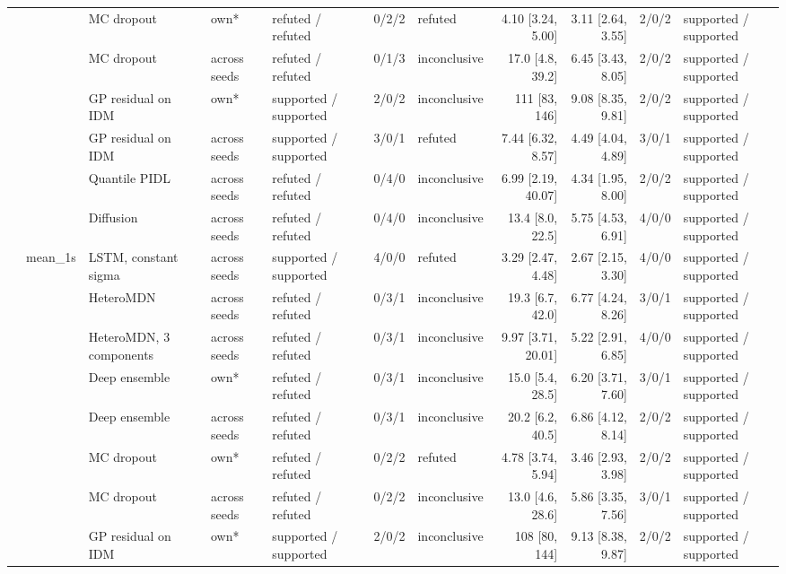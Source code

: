 \begin{longtable}{lllllrlrrrl}
 &  & MC dropout & own* & refuted / refuted & 0/2/2 & refuted & 4.10 [3.24, 5.00] & 3.11 [2.64, 3.55] & 2/0/2 & supported / supported \\
 &  & MC dropout & across seeds & refuted / refuted & 0/1/3 & inconclusive & 17.0 [4.8, 39.2] & 6.45 [3.43, 8.05] & 2/0/2 & supported / supported \\
 &  & GP residual on IDM & own* & supported / supported & 2/0/2 & inconclusive & 111 [83, 146] & 9.08 [8.35, 9.81] & 2/0/2 & supported / supported \\
 &  & GP residual on IDM & across seeds & supported / supported & 3/0/1 & refuted & 7.44 [6.32, 8.57] & 4.49 [4.04, 4.89] & 3/0/1 & supported / supported \\
 &  & Quantile PIDL & across seeds & refuted / refuted & 0/4/0 & inconclusive & 6.99 [2.19, 40.07] & 4.34 [1.95, 8.00] & 2/0/2 & supported / supported \\
 &  & Diffusion & across seeds & refuted / refuted & 0/4/0 & inconclusive & 13.4 [8.0, 22.5] & 5.75 [4.53, 6.91] & 4/0/0 & supported / supported \\
\midrule
 & mean\_1s & LSTM, constant sigma & across seeds & supported / supported & 4/0/0 & refuted & 3.29 [2.47, 4.48] & 2.67 [2.15, 3.30] & 4/0/0 & supported / supported \\
 &  & HeteroMDN & across seeds & refuted / refuted & 0/3/1 & inconclusive & 19.3 [6.7, 42.0] & 6.77 [4.24, 8.26] & 3/0/1 & supported / supported \\
 &  & HeteroMDN, 3 components & across seeds & refuted / refuted & 0/3/1 & inconclusive & 9.97 [3.71, 20.01] & 5.22 [2.91, 6.85] & 4/0/0 & supported / supported \\
 &  & Deep ensemble & own* & refuted / refuted & 0/3/1 & inconclusive & 15.0 [5.4, 28.5] & 6.20 [3.71, 7.60] & 3/0/1 & supported / supported \\
 &  & Deep ensemble & across seeds & refuted / refuted & 0/3/1 & inconclusive & 20.2 [6.2, 40.5] & 6.86 [4.12, 8.14] & 2/0/2 & supported / supported \\
 &  & MC dropout & own* & refuted / refuted & 0/2/2 & refuted & 4.78 [3.74, 5.94] & 3.46 [2.93, 3.98] & 2/0/2 & supported / supported \\
 &  & MC dropout & across seeds & refuted / refuted & 0/2/2 & inconclusive & 13.0 [4.6, 28.6] & 5.86 [3.35, 7.56] & 3/0/1 & supported / supported \\
 &  & GP residual on IDM & own* & supported / supported & 2/0/2 & inconclusive & 108 [80, 144] & 9.13 [8.38, 9.87] & 2/0/2 & supported / supported \\

\end{longtable}
